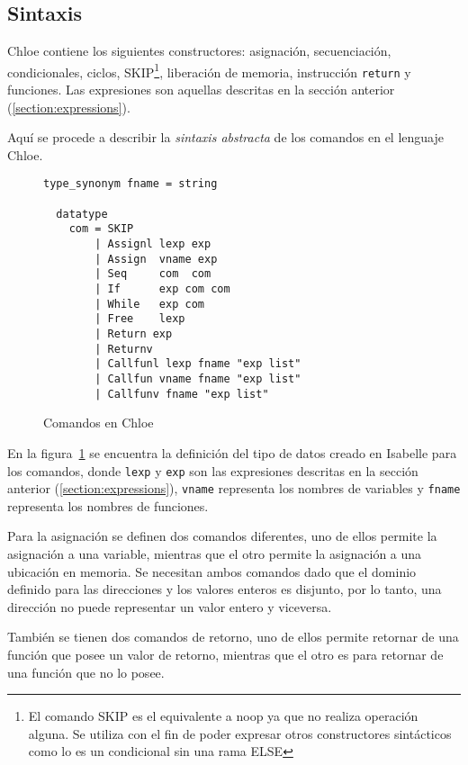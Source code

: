 \subsection{Sintaxis}\label{subsection:syntax_commands}

Chloe contiene los siguientes constructores: asignación, secuenciación, condicionales, ciclos, SKIP\footnote{El comando SKIP es el equivalente a noop ya que no realiza operación alguna. Se utiliza con el fin de poder expresar otros constructores sintácticos como lo es un condicional sin una rama ELSE}, liberación de memoria, instrucción \verb|return| y funciones.
Las expresiones son aquellas descritas en la sección anterior (\ref{section:expressions}).

Aquí se procede a describir la \textit{sintaxis abstracta} de los comandos en el lenguaje Chloe.

\begin{figure}
  \begin{lstlisting}[frame=single, mathescape=true]
  type_synonym fname = string

  datatype
    com = SKIP
        | Assignl lexp exp
        | Assign  vname exp
        | Seq     com  com
        | If      exp com com
        | While   exp com
        | Free    lexp
        | Return exp
        | Returnv
        | Callfunl lexp fname "exp list"
        | Callfun vname fname "exp list"
        | Callfunv fname "exp list"
  \end{lstlisting}

  \caption{Comandos en Chloe}
  \label{fig:chloe_commands}
\end{figure}

En la figura~\ref{fig:chloe_commands} se encuentra la definición del tipo de datos creado en Isabelle para los comandos, donde \verb|lexp| y \verb|exp| son las expresiones descritas en la sección anterior (\ref{section:expressions}), \verb|vname| representa los nombres de variables y \verb|fname| representa los nombres de funciones.

Para la asignación se definen dos comandos diferentes, uno de ellos permite la asignación a una variable, mientras que el otro permite la asignación a una ubicación en memoria.
Se necesitan ambos comandos dado que el dominio definido para las direcciones y los valores enteros es disjunto, por lo tanto, una dirección no puede representar un valor entero y viceversa.

También se tienen dos comandos de retorno, uno de ellos permite retornar de una función que posee un valor de retorno, mientras que el otro es para retornar de una función que no lo posee.

